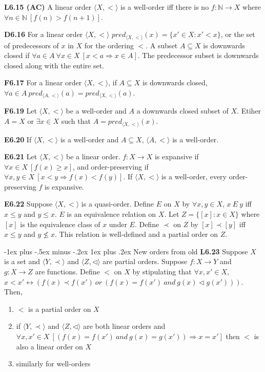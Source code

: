 \documentclass[10pt, landscape]{article}
\makeatletter
\renewcommand{\subsection}{\@startsection{subsection}{3}{0mm}%
                                {-1ex plus -.5ex minus -.2ex}%
                                {1ex plus .2ex}%
                                {\normalfont\small\bfseries}}%
\makeatother
\begin{document}
\begin{multicols*}{3}
\textbf{L6.15 (AC)} A linear order $\langle X, < \rangle$ is a well-order iff there is no $f : \mathbb{N} \rightarrow X$ where $\forall n \in \mathbb{N} \ [f(n) > f(n+1)]$.

\textbf{D6.16} For a linear order $\langle X, < \rangle$ $pred_{\langle X, < \rangle}(x)=\{x' \in X : x' < x\}$, or the set of predecessors of $x$ in $X$ for the ordering $<$. A subset $A \subseteq X$ is downwards closed if $\forall a \in A \ \forall x \in X \ [x < a \Rightarrow x \in A]$. The predecessor subset is downwards closed along with the entire set.

\textbf{F6.17} For a linear order $\langle X, < \rangle$, if $A \subseteq X$ is downwards closed, $\forall a \in A \ pred_{\langle A, < \rangle}(a)=pred_{\langle X, < \rangle}(a)$.

\textbf{F6.19} Let $\langle X, < \rangle$ be a well-order and $A$ a downwards closed subset of $X$. Etiher $A=X$ or $\exists x \in X$ such that $A = pred_{\langle X, < \rangle}(x)$.

\textbf{E6.20} If $\langle X, < \rangle$ is a well-order and $A \subseteq X$, $\langle A, < \rangle$ is a well-order.

\textbf{E6.21} Let $\langle X, < \rangle$ be a linear order. $f: X \rightarrow X$ is expansive if $\forall x \in X\ [f(x) \geq x]$, and order-preserving if $\forall x, y \in X \ [x < y \Rightarrow f(x) < f(y)]$. If $\langle X, < \rangle$ is a well-order, every order-preserving $f$ is expansive.

\textbf{E6.22} Suppose $\langle X, < \rangle$ is a quasi-order. Define $E$ on $X$ by $\forall x, y \in X$, $x\ E\ y$ iff $x \leq y$ and $y \leq x$. $E$ is an equivalence relation on $X$. Let $Z=\{[x] : x \in X\}$ where $[x]$ is the equivalence class of $x$ under $E$. Define $\prec$ on $Z$ by $[x] \prec [y]$ iff $x \leq y$ and $y \not \leq x$. This relation is well-defined and a partial order on $Z$.

\subsection{New orders from old}
\textbf{L6.23} Suppose $X$ is a set and $\langle Y, \prec \rangle$ and $\langle Z, \lhd \rangle$ are partial orders. Suppose $f: X \rightarrow Y$ and $g : X \rightarrow Z$ are functions. Define $<$ on $X$ by stipulating that $\forall x, x' \in X$, $x < x' \leftrightarrow (f(x) \prec f(x')\ or \ (f(x) = f(x') \ and \ g(x) \lhd g(x')))$. Then,
\begin{enumerate}
    \item $<$ is a partial order on $X$
    \item if $\langle Y, \prec \rangle$ and $\langle Z, \lhd \rangle$ are both linear orders and $\forall x, x' \in X \ [(f(x) = f(x') \ and \ g(x) = g(x')) \Rightarrow x = x']$ then $<$ is also a linear order on $X$
    \item similarly for well-orders
\end{enumerate}


\end{multicols*}
\end{document}
